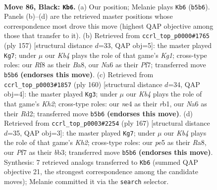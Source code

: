 \documentclass[11pt]{article}
\begin{document}
\clearpage

\begin{figure}[p]\centering
\begin{subfigure}{0.46\textwidth}\centering
\resizebox{\linewidth}{!}{%
\newchessgame
\chessboard[
  setfen={5r2/5p2/n5p1/1k2P2p/4NPp1/8/7P/1B1b2K1 b - - 31 86},
  showmover=false,
  pgfstyle=straightmove, color=movearrow, markmove={b5-b6}
]}
\caption{}
\end{subfigure}\hfill
\begin{subfigure}{0.46\textwidth}\centering
\resizebox{\linewidth}{!}{%
\newchessgame
\chessboard[
  setfen={b5k1/5p2/p2Bp1p1/P3P1Pp/7P/4K3/8/8 b - - 28 79},
  showmover=false,
  pgfstyle=straightmove, color=movearrow, markmove={g8-g7}
]}
\caption{}
\end{subfigure}
\\[4pt]
\begin{subfigure}{0.46\textwidth}\centering
\resizebox{\linewidth}{!}{%
\newchessgame
\chessboard[
  setfen={8/5pk1/7p/6p1/6P1/4P2P/3R1P1K/1r6 w - - 72 81},
  showmover=false,
  pgfstyle=straightmove, color=movearrow, markmove={h2-g3}
]}
\caption{}
\end{subfigure}\hfill
\begin{subfigure}{0.46\textwidth}\centering
\resizebox{\linewidth}{!}{%
\newchessgame
\chessboard[
  setfen={r7/7k/6p1/5p1p/5P1P/1B1NK3/6P1/8 b - - 4 84},
  showmover=false,
  pgfstyle=straightmove, color=movearrow, markmove={h7-g7}
]}
\caption{}
\end{subfigure}
\caption{\textbf{Move 86, Black: \texttt{Kb6}.} (a) Our position; Melanie plays \texttt{Kb6} (\texttt{b5b6}). Panels (b)--(d) are the retrieved master positions whose correspondence most drove this move (highest QAP objective among those that transfer to it). (b) Retrieved from \texttt{ccrl\_top\_p0000\#1765} (ply 157) [structural distance $d$=33, QAP obj=5]: the master played \texttt{Kg7}; under $\mu$ our \emph{Kb4} plays the role of that game's \emph{Kg1}; cross-type roles: our \emph{R}f8 as their \emph{B}a8, our \emph{N}a6 as their \emph{P}f7; transferred move \texttt{b5b6} \textbf{(endorses this move)}. (c) Retrieved from \texttt{ccrl\_top\_p0003\#1857} (ply 160) [structural distance $d$=34, QAP obj=4]: the master played \texttt{Kg3}; under $\mu$ our \emph{Kb4} plays the role of that game's \emph{Kh2}; cross-type roles: our \emph{n}e4 as their \emph{r}b1, our \emph{N}a6 as their \emph{R}d2; transferred move \texttt{b5b6} \textbf{(endorses this move)}. (d) Retrieved from \texttt{ccrl\_top\_p0003\#2254} (ply 167) [structural distance $d$=35, QAP obj=3]: the master played \texttt{Kg7}; under $\mu$ our \emph{Kb4} plays the role of that game's \emph{Kh2}; cross-type roles: our \emph{p}e5 as their \emph{R}a8, our \emph{P}f7 as their \emph{b}b3; transferred move \texttt{b5b6} \textbf{(endorses this move)}. Synthesis: 7 retrieved analogs transferred to \texttt{Kb6} (summed QAP objective 21, the strongest correspondence among the candidate moves); Melanie committed it via the \texttt{search} selector.}
\label{fig:thought-m171}
\end{figure}
\end{document}
